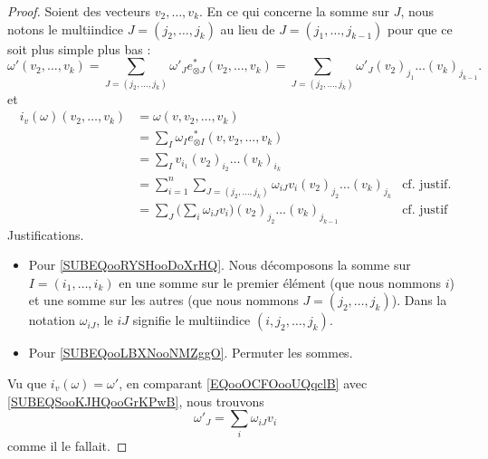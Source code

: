 \begin{proof}
	Soient des vecteurs \( v_2,\ldots,v_k\). En ce qui concerne la somme sur \( J\), nous notons le multiindice \( J=(j_2,\ldots,j_k)\) au lieu de \( J=(j_1,\ldots,j_{k-1})\) pour que ce soit plus simple plus bas :
	\begin{equation}		\label{EQooOCFOooUQqclB}
		\omega'(v_2,\ldots,v_k)=\sum_{J=(j_2,\ldots,j_{k})}\omega'_Je^*_{\otimes J}(v_2,\ldots,v_k)=\sum_{J=(j_2,\ldots,j_k)}\omega'_J(v_2)_{j_1}\ldots (v_k)_{j_{k-1}}.
	\end{equation}
	et
	\begin{subequations}		\label{SUBEQSooKJHQooGrKPwB}
		\begin{align}
			i_v(\omega)(v_2,\ldots,v_k) & = \omega(v,v_2,\ldots,v_k)                                                                                                         \\
			                            & = \sum_I\omega_Ie^*_{\otimes I}(v,v_2,\ldots,v_k)                                                                                  \\
			                            & = \sum_Iv_{i_1}(v_2)_{i_2}\ldots (v_k)_{i_k}                                                                                       \\
			                            & = \sum_{i=1}^n\sum_{J=(j_2,\ldots,j_k)}\omega_{iJ}v_i(v_2)_{j_2}\ldots (v_k)_{j_k} & \text{cf. justif.}	\label{SUBEQooRYSHooDoXrHQ} \\
			                            & = \sum_J\big( \sum_{i}\omega_{iJ}v_i \big)(v_2)_{j_2}\ldots (v_k)_{j_{k-1}}        & \text{cf. justif} \label{SUBEQooLBXNooNMZggO}
		\end{align}
	\end{subequations}
	Justifications.
	\begin{itemize}
		\item
		      Pour \eqref{SUBEQooRYSHooDoXrHQ}. Nous décomposons la somme sur \( I=(i_1,\ldots,i_k)\) en une somme sur le premier élément (que nous nommons \( i\)) et une somme sur les autres (que nous nommons \( J=(j_2,\ldots,j_k)\)). Dans la notation \( \omega_{iJ}\), le \( iJ\) signifie le multiindice \( (i, j_2,\ldots,j_k)\).
		\item
		      Pour \eqref{SUBEQooLBXNooNMZggO}. Permuter les sommes.
	\end{itemize}
	Vu que \( i_v(\omega)=\omega'\), en comparant \eqref{EQooOCFOooUQqclB} avec \eqref{SUBEQSooKJHQooGrKPwB}, nous trouvons
	\begin{equation}
		\omega'_J=\sum_i\omega_{iJ}v_i
	\end{equation}
	comme il le fallait.
\end{proof}


